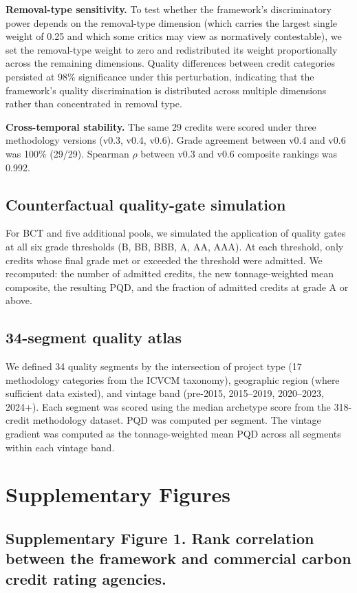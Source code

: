 \documentclass[11pt]{article}
\begin{document}
\textbf{Removal-type sensitivity.} To test whether the framework's discriminatory power depends on the removal-type dimension (which carries the largest single weight of 0.25 and which some critics may view as normatively contestable), we set the removal-type weight to zero and redistributed its weight proportionally across the remaining dimensions. Quality differences between credit categories persisted at 98\% significance under this perturbation, indicating that the framework's quality discrimination is distributed across multiple dimensions rather than concentrated in removal type.

\textbf{Cross-temporal stability.} The same 29 credits were scored under three methodology versions (v0.3, v0.4, v0.6). Grade agreement between v0.4 and v0.6 was 100\% (29/29). Spearman $\rho$ between v0.3 and v0.6 composite rankings was 0.992.

\subsection*{Counterfactual quality-gate simulation}

For BCT and five additional pools, we simulated the application of quality gates at all six grade thresholds (B, BB, BBB, A, AA, AAA). At each threshold, only credits whose final grade met or exceeded the threshold were admitted. We recomputed: the number of admitted credits, the new tonnage-weighted mean composite, the resulting PQD, and the fraction of admitted credits at grade A or above.

\subsection*{34-segment quality atlas}

We defined 34 quality segments by the intersection of project type (17 methodology categories from the ICVCM taxonomy), geographic region (where sufficient data existed), and vintage band (pre-2015, 2015--2019, 2020--2023, 2024+). Each segment was scored using the median archetype score from the 318-credit methodology dataset. PQD was computed per segment. The vintage gradient was computed as the tonnage-weighted mean PQD across all segments within each vintage band.


\section*{Supplementary Figures}

\subsection*{Supplementary Figure 1. Rank correlation between the framework and commercial carbon credit rating agencies.}
\end{document}
